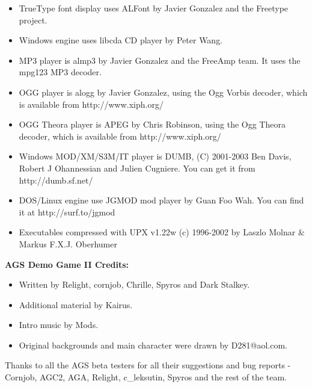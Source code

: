 \begin{itemize}
\item TrueType font display uses ALFont by Javier Gonzalez and the Freetype project.
\item Windows engine uses libcda CD player by Peter Wang.
\item MP3 player is almp3 by Javier Gonzalez and the FreeAmp team. It uses the mpg123 MP3 decoder.
\item OGG player is alogg by Javier Gonzalez, using the Ogg Vorbis decoder, which is available
from http://www.xiph.org/
\item OGG Theora player is APEG by Chris Robinson, using the Ogg Theora decoder, which is available
from http://www.xiph.org/
\item Windows MOD/XM/S3M/IT player is DUMB, (C) 2001-2003 Ben Davis, Robert J Ohannessian and Julien Cugniere. You
can get it from http://dumb.sf.net/
\item DOS/Linux engine use JGMOD mod player by Guan Foo Wah. You can find it at
  http://surf.to/jgmod
\item Executables compressed with UPX v1.22w (c) 1996-2002 by Laszlo Molnar & Markus F.X.J. Oberhumer
\end{itemize}

\bf{AGS Demo Game II Credits:}

\begin{itemize}
\item Written by Relight, cornjob, Chrille, Spyros and Dark Stalkey.
\item Additional material by Kairus.
\item Intro music by Mods.
\item Original backgrounds and main character were drawn by D281@aol.com.
\end{itemize}

Thanks to all the AGS beta testers for all their suggestions and bug reports -
Cornjob, AGC2, AGA, Relight, c_leksutin, Spyros and the rest of the team.



